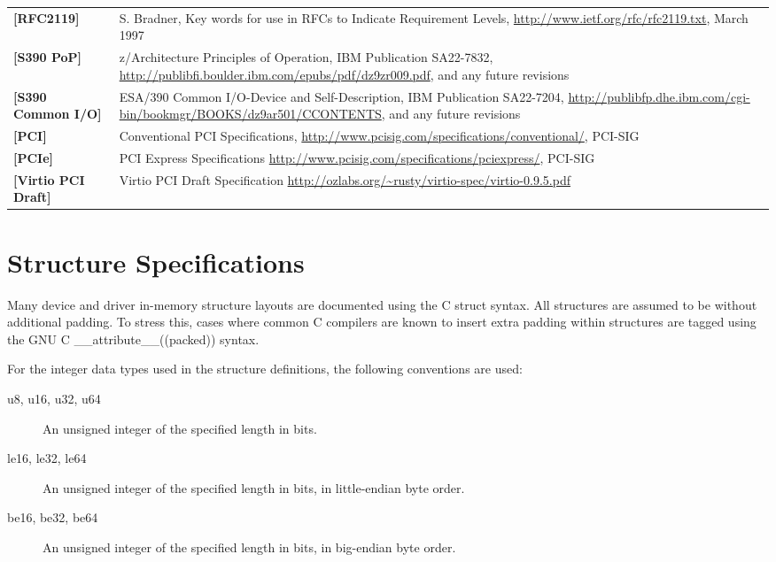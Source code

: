 \begin{longtable}{l p{5in}}
	\label{intro:rfc2119}\textbf{[RFC2119]} & S. Bradner, Key words for use in RFCs to Indicate Requirement Levels, \newline\url{http://www.ietf.org/rfc/rfc2119.txt}, March 1997\\
	\label{intro:S390 PoP}\textbf{[S390 PoP]} & z/Architecture Principles of Operation, IBM Publication SA22-7832, \newline\url{http://publibfi.boulder.ibm.com/epubs/pdf/dz9zr009.pdf}, and any future revisions\\
	\label{intro:S390 Common I/O}\textbf{[S390 Common I/O]} & ESA/390 Common I/O-Device and Self-Description, IBM Publication SA22-7204, \newline\url{http://publibfp.dhe.ibm.com/cgi-bin/bookmgr/BOOKS/dz9ar501/CCONTENTS}, and any future revisions\\
	\label{intro:PCI}\textbf{[PCI]} &
	Conventional PCI Specifications,
	\newline\url{http://www.pcisig.com/specifications/conventional/},
	PCI-SIG\\
	\label{intro:PCIe}\textbf{[PCIe]} &
	PCI Express Specifications
	\newline\url{http://www.pcisig.com/specifications/pciexpress/},
	PCI-SIG\\
	\label{intro:Virtio PCI Draft}\textbf{[Virtio PCI Draft]} &
	Virtio PCI Draft Specification
	\newline\url{http://ozlabs.org/~rusty/virtio-spec/virtio-0.9.5.pdf}\\
\end{longtable}

\section{Structure Specifications}

Many device and driver in-memory structure layouts are documented using
the C struct syntax. All structures are assumed to be without additional
padding. To stress this, cases where common C compilers are known to insert
extra padding within structures are tagged using the GNU C
__attribute__((packed))  syntax.

For the integer data types used in the structure definitions, the following
conventions are used:

\begin{description}
\item[u8, u16, u32, u64] An unsigned integer of the specified length in bits.

\item[le16, le32, le64] An unsigned integer of the specified length in bits,
in little-endian byte order.

\item[be16, be32, be64] An unsigned integer of the specified length in bits,
in big-endian byte order.
\end{description}

\newpage

